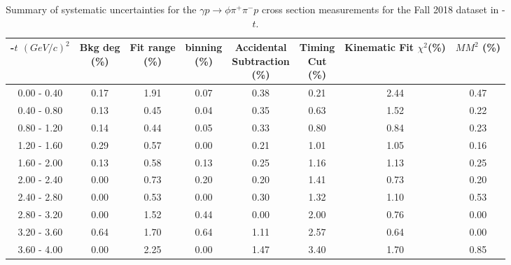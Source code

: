 \begin{table}[!htbp]
    \small
    \centering
    \caption{Summary of systematic uncertainties for the $\gamma p \rightarrow \phi \pi^{+} \pi^{-} p$ cross section measurements for the Fall 2018 dataset in -$t$.}
    \label{tab.syserr.phi2pi.4.2}
    \begin{tabular}{|c|c|c|c|c|c|c|c|}
        \hline
        -$t$ $(GeV/c)^{2}$&\thead{Bkg deg\\(\%)}&\thead{Fit range\\(\%)}&\thead{binning\\(\%)}&\thead{Accidental\\Subtraction\\(\%)}&\thead{Timing\\Cut\\(\%)}&\thead{Kinematic\\Fit $\chi^{2}$(\%)}&\thead{$MM^{2}$\\(\%)}\\
        \hline
        0.00 - 0.40 & 0.17 & 1.91 & 0.07 & 0.38 & 0.21 & 2.44 & 0.47 \\ 
        0.40 - 0.80 & 0.13 & 0.45 & 0.04 & 0.35 & 0.63 & 1.52 & 0.22 \\ 
        0.80 - 1.20 & 0.14 & 0.44 & 0.05 & 0.33 & 0.80 & 0.84 & 0.23 \\ 
        1.20 - 1.60 & 0.29 & 0.57 & 0.00 & 0.21 & 1.01 & 1.05 & 0.16 \\ 
        1.60 - 2.00 & 0.13 & 0.58 & 0.13 & 0.25 & 1.16 & 1.13 & 0.25 \\ 
        2.00 - 2.40 & 0.00 & 0.73 & 0.20 & 0.20 & 1.41 & 0.73 & 0.20 \\ 
        2.40 - 2.80 & 0.00 & 0.53 & 0.00 & 0.30 & 1.32 & 1.10 & 0.53 \\ 
        2.80 - 3.20 & 0.00 & 1.52 & 0.44 & 0.00 & 2.00 & 0.76 & 0.00 \\ 
        3.20 - 3.60 & 0.64 & 1.70 & 0.64 & 1.11 & 2.57 & 0.64 & 0.00 \\ 
        3.60 - 4.00 & 0.00 & 2.25 & 0.00 & 1.47 & 3.40 & 1.70 & 0.85 \\
        \hline
    \end{tabular}
\end{table}

